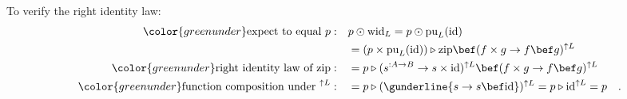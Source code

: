 To verify the right identity law:
\begin{align*}
{\color{greenunder}\text{expect to equal }p:}\quad & p\odot\text{wid}_{L}=p\odot\text{pu}_{L}(\text{id})\\
 & =(p\times\text{pu}_{L}(\text{id}))\triangleright\text{zip}\bef(f\times g\rightarrow f\bef g)^{\uparrow L}\\
{\color{greenunder}\text{right identity law of }\text{zip}:}\quad & =p\triangleright(s^{:A\rightarrow B}\rightarrow s\times\text{id})^{\uparrow L}\bef(f\times g\rightarrow f\bef g)^{\uparrow L}\\
{\color{greenunder}\text{function composition under }^{\uparrow L}:}\quad & =p\triangleright(\gunderline{s\rightarrow s\bef\text{id}})^{\uparrow L}=p\triangleright\text{id}^{\uparrow L}=p\quad.
\end{align*}

